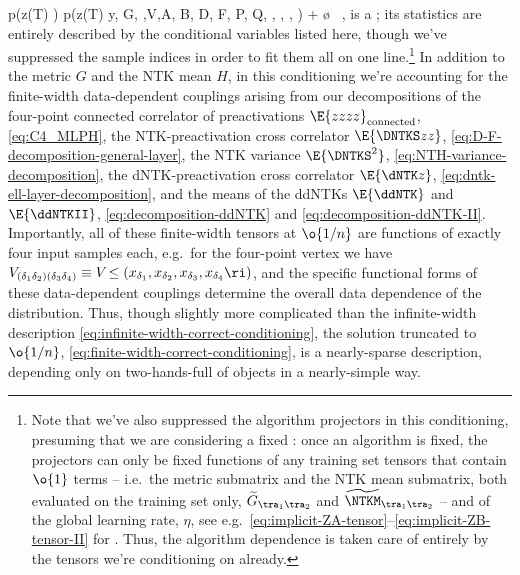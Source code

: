 \be\label{eq:finite-width-correct-conditioning}
p\Big(z(T) \Big) \equiv p\!\le(z(T) \Big\vert y, G, \NTKM,V,A, B, D, F, P, Q, \ddNTKRS, \ddNTKSS, \ddNTKTS, \ddNTKUS\ri)
+ \o{}
\, ,
\ee
is a ; its statistics are entirely described by the conditional variables listed here, though we've  suppressed the sample indices in order to fit them all on one line.\footnote{
    Note that we've also suppressed the algorithm projectors in this conditioning, presuming that we are considering a fixed : once an algorithm is fixed, the projectors
    can only be 
    fixed functions of any training set tensors that contain $\o{1}$ terms -- i.e.~the metric submatrix and the NTK mean submatrix, both evaluated on the training set only, $\widetilde{G}_{\tra_1\tra_2}$ and  $\widetilde{\NTKM}_{\tra_1\tra_2}$ -- and
    of the global learning rate, $\eta$,
    see e.g.~\eqref{eq:implicit-ZA-tensor}--\eqref{eq:implicit-ZB-tensor-II} for .
    Thus, the algorithm dependence is taken care of entirely by the tensors we're conditioning on already.
}
In addition to the metric $G$ and the NTK mean $H$, in this conditioning we're accounting for the finite-width data-dependent couplings arising from our decompositions of the four-point connected correlator of preactivations $\E{zzzz}_{\text{connected}}$, \eqref{eq:C4_MLPH},  the NTK-preactivation cross correlator $\E{\DNTKS z z}$, \eqref{eq:D-F-decomposition-general-layer}, the NTK variance $\E{\DNTKS^2}$, \eqref{eq:NTH-variance-decomposition},
the dNTK-preactivation cross correlator $\E{\dNTK z}$, \eqref{eq:dntk-ell-layer-decomposition},
and the means of the ddNTKs $\E{\ddNTK}$ and $\E{\ddNTKII}$, \eqref{eq:decomposition-ddNTK} and \eqref{eq:decomposition-ddNTK-II}.
Importantly, all of these finite-width tensors at $\o{1/n}$ are functions of exactly four input samples each, e.g.~for the four-point vertex we have $V_{(\delta_1 \delta_2)(\delta_3\delta_4)} \equiv V\!\le(x_{\delta_1},  x_{\delta_2},x_{\delta_3},x_{\delta_4}\ri)$, and the specific functional forms of these data-dependent couplings determine the 
overall data dependence of the distribution.
Thus, though 
slightly more complicated than the infinite-width description \eqref{eq:infinite-width-correct-conditioning}, the solution truncated to $\o{1/n}$, \eqref{eq:finite-width-correct-conditioning}, is 
a nearly-sparse description, depending only on two-hands-full of objects in a nearly-simple way.













